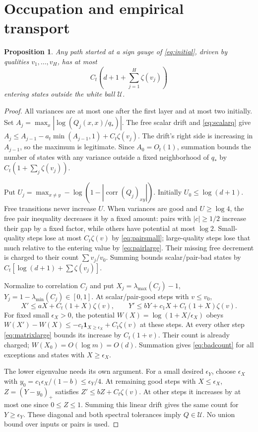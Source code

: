 \documentclass[11pt]{article}
\newtheorem{proposition}[theorem]{Proposition}
\begin{document}
\section{Occupation and empirical transport}
\begin{proposition}\label{prop:occupation}
Any path started at a sign gauge of \eqref{eq:initial}, driven by qualities $v_1,\ldots,v_H$, has at most
\begin{equation}\label{eq:badcount}
 C_t\left(d+1+\sum_{j=1}^H\zeta(v_j)\right)
\end{equation}
entering states outside the white ball $\mathcal U$.
\end{proposition}
\begin{proof}
All variances are at most one after the first layer and at most two initially. Set $A_j=\max_x|\log(Q_j(x,x)/q_*)|$. The free scalar drift and \eqref{eq:scalarq} give
$A_j\le A_{j-1}-a_t\min(A_{j-1},1)+C_t\zeta(v_j)$.
The drift's right side is increasing in $A_{j-1}$, so the maximum is legitimate. Since $A_0=O_t(1)$, summation bounds the number of states with any variance outside a fixed neighborhood of $q_*$ by $C_t(1+\sum_j\zeta(v_j))$.

Put $U_j=\max_{x\ne y}-\log(1-|\operatorname{corr}(Q_j)_{xy}|)$. Initially $U_0\le\log(d+1)$. Free transitions never increase $U$. When variances are good and $U\ge\log4$, the free pair inequality decreases it by a fixed amount: pairs with $|c|\ge1/2$ increase their gap by a fixed factor, while others have potential at most $\log2$. Small-quality steps lose at most $C_t\zeta(v)$ by \eqref{eq:pairsmall}; large-quality steps lose that much relative to the entering value by \eqref{eq:pairlarge}. Their missing free decrement is charged to their count $\sum v_j/v_0$. Summing bounds scalar/pair-bad states by $C_t[\log(d+1)+\sum\zeta(v_j)]$.

Normalize to correlation $C_j$ and put $X_j=\lambda_{\max}(C_j)-1$, $Y_j=1-\lambda_{\min}(C_j)\in[0,1]$. At scalar/pair-good steps with $v\le v_0$,
\[
 X'\le aX+C_t(1+X)\zeta(v),\qquad
 Y'\le bY+c_1X+C_t(1+X)\zeta(v).
\]
For fixed small $\epsilon_X>0$, the potential $W(X)=\log(1+X/\epsilon_X)$ obeys
$W(X')-W(X)\le-c_t\mathbf1_{X\ge\epsilon_X}+C_t\zeta(v)$ at these steps. At every other step \eqref{eq:matrixlarge} bounds its increase by $C_t(1+v)$. Their count is already charged; $W(X_0)=O(\log m)=O(d)$. Summation gives \eqref{eq:badcount} for all exceptions and states with $X\ge\epsilon_X$.

The lower eigenvalue needs its own argument. For a small desired $\epsilon_Y$, choose $\epsilon_X$ with $y_0=c_1\epsilon_X/(1-b)\le\epsilon_Y/4$. At remaining good steps with $X\le\epsilon_X$, $Z=(Y-y_0)_+$ satisfies $Z'\le bZ+C_t\zeta(v)$. At other steps it increases by at most one since $0\le Z\le1$. Summing this linear drift gives the same count for $Y\ge\epsilon_Y$. These diagonal and both spectral tolerances imply $Q\in\mathcal U$. No union bound over inputs or pairs is used.
\end{proof}
\end{document}
